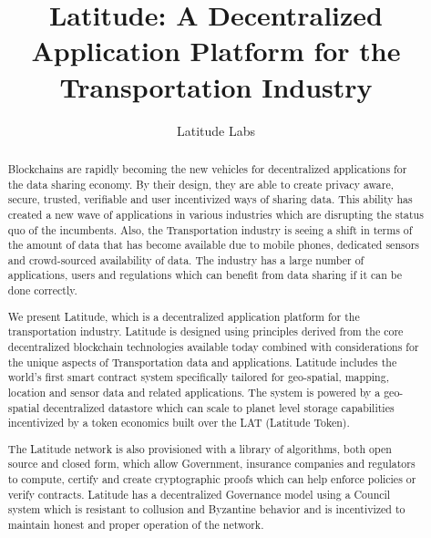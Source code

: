 \documentclass[preprint,11pt]{elsarticle}
\theoremstyle{definition}
\begin{document}
\begin{frontmatter}


\title{\textsf{Latitude: A Decentralized Application Platform for the Transportation Industry}}

\author{Latitude Labs}
\address{Silicon Valley, California}

\begin{abstract}
\fontsize{10pt}{12pt}\selectfont
Blockchains are rapidly becoming the new vehicles for decentralized applications for the data sharing economy. By their
    design, they are able to create privacy aware, secure, trusted, verifiable and user incentivized ways of sharing
    data. This ability has created a new wave of applications in various industries which are disrupting the status quo
    of the incumbents. Also, the Transportation industry is seeing a shift in terms of the amount of data that has
    become available due to mobile phones, dedicated sensors and crowd-sourced availability of data. The industry has a
    large number of applications, users and regulations which can benefit from data sharing if it can be done correctly.

 We present Latitude, which is a decentralized application platform for the transportation industry.
    Latitude is designed using principles derived from the core decentralized blockchain technologies available today
    combined with considerations for the unique aspects of Transportation data and applications. Latitude
    includes the world's first smart contract system specifically tailored for geo-spatial, mapping, location and sensor
    data and related applications. The system is powered by a geo-spatial decentralized datastore which can scale to
    planet level storage capabilities incentivized by a token economics built over the LAT (Latitude Token).

    The Latitude network is also provisioned with a library of algorithms, both open source and closed form, which allow
    Government, insurance companies and regulators to compute, certify and create cryptographic proofs which can help enforce policies
    or verify contracts.  Latitude has a decentralized Governance model using a Council system which is resistant to
    collusion and Byzantine behavior and is incentivized to maintain honest and proper operation of the network.


\end{abstract}
\end{frontmatter}
\end{document}
